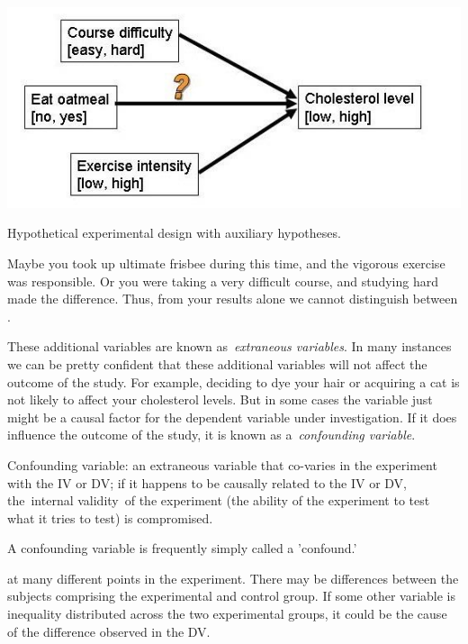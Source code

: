 \begin{refsection}
\begin{marginfigure}
 \begin{center}

  \includegraphics{../images/cholesterolcausaldiagram.jpg}
\end{center}
 \caption{Hypothetical experimental design with auxiliary hypotheses.}
\label{fig: cholestrol-withauxiliary}
\end{marginfigure}
Maybe you took up ultimate frisbee during this time, and the vigorous exercise was responsible. Or you were taking a very difficult course, and studying hard made the difference. Thus, from your results alone we cannot distinguish between .

These additional variables are known as \emph{extraneous variables}. In many instances we can be pretty confident that these additional variables will not affect the outcome of the study. For example, deciding to dye your hair or acquiring a cat is not likely to affect your cholesterol levels. But in some cases the variable just might be a causal factor for the dependent variable under investigation. If it does influence the outcome of the study, it is known as a \emph{confounding variable}.

\begin{thesis}\label{thesis:confoundingvariables}Confounding variable: an extraneous variable that co-varies in the experiment with the IV or DV; if it happens to be causally related to the IV or DV, the internal validity of the experiment (the ability of the experiment to test what it tries to test) is compromised. \newline

A confounding variable is frequently simply called a 'confound.'\end{thesis}

 at many different points in the experiment. There may be differences between the subjects comprising the experimental and control group. If some other variable is inequality distributed across the two experimental groups, it could be the cause of the difference observed in the DV. 


\end{refsection}
